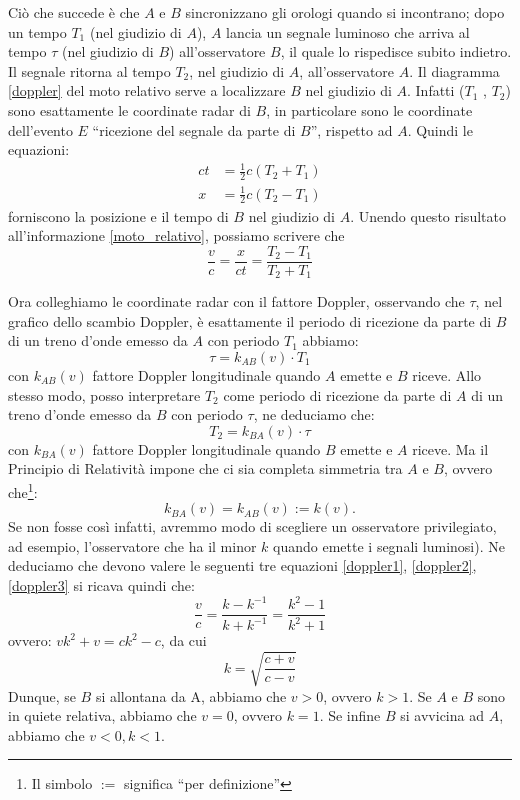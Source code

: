 Ciò che succede è che $A$ e $B$ sincronizzano gli orologi quando si incontrano;
dopo un tempo $T_1$ (nel giudizio di $A$), $A$ lancia un segnale luminoso che arriva
al tempo $\tau$ (nel giudizio di $B$) all'osservatore $B$, il quale lo rispedisce subito
indietro. Il segnale ritorna al tempo $T_2$, nel giudizio di $A$, all'osservatore $A$.
Il diagramma \ref{doppler} del moto relativo serve a localizzare $B$ nel giudizio di
$A$. Infatti ($T_1$ , $T_2$) sono esattamente le coordinate radar di $B$, in particolare
sono le coordinate dell'evento $E$ ``ricezione del segnale da parte di $B$'', rispetto ad $A$. 
Quindi le equazioni:
\begin{equation}
 \begin{array}{ll}
  ct &= \frac{1}{2} c(T_2 + T_1) \\
  x &= \frac{1}{2} c(T_2 - T_1)
 \end{array}
\end{equation}
forniscono la posizione e il tempo di $B$ nel giudizio di $A$. 
Unendo questo risultato all'informazione \ref{moto_relativo}, possiamo scrivere che
\begin{equation}\label{doppler1}
 \dfrac{v}{c} = \dfrac{x}{ct} =\dfrac{T_2 - T_1}{T_2 + T_1} 
\end{equation}

Ora colleghiamo le coordinate radar con il fattore Doppler, osservando
che $\tau$, nel grafico dello scambio Doppler, è esattamente il periodo di ricezione
da parte di $B$ di un treno d'onde emesso da $A$ con periodo $T_1$ abbiamo:
\begin{equation}\label{doppler2}
\tau = k_{AB} (v) \cdot T_1
\end{equation}
con $k_{AB} (v)$ fattore Doppler longitudinale quando $A$ emette e $B$ riceve. Allo
stesso modo, posso interpretare $T_2$ come periodo di ricezione da parte di $A$ di
un treno d'onde emesso da $B$ con periodo $\tau$, ne deduciamo che:
\begin{equation}\label{doppler3}
T_2 = k_{BA} (v) \cdot \tau
\end{equation}
con $k_{BA} (v)$ fattore Doppler longitudinale quando $B$ emette e $A$ riceve.
Ma il Principio di Relatività impone che ci sia completa simmetria tra
$A$ e $B$, ovvero che\footnote{Il simbolo $:=$ significa ``per definizione''}:
\begin{equation}
k_{BA} (v) = k_{AB} (v) := k(v).
\end{equation}
Se non fosse così infatti, avremmo modo di scegliere un osservatore privilegiato, ad esempio, 
l'osservatore che ha il minor $k$ quando emette i segnali luminosi).
Ne deduciamo che devono valere le seguenti tre equazioni \ref{doppler1}, \ref{doppler2},
\ref{doppler3} si ricava quindi che:
\[
 \dfrac{v}{c} = \dfrac{k - k^{-1}}{k + k^{-1}} = \dfrac{k^2 -1}{k^2 +1}
\]
ovvero: $vk^2 + v = ck^2 - c$, da cui
\begin{equation}
k = \sqrt{\dfrac{c+v}{c-v}} 
\end{equation}
Dunque, se $B$ si allontana da A, abbiamo che $v > 0$, ovvero $k > 1$. Se $A$
e $B$ sono in quiete relativa, abbiamo che $v = 0$, ovvero $k = 1$. Se infine $B$ si
avvicina ad $A$, abbiamo che $v < 0, k < 1$.


